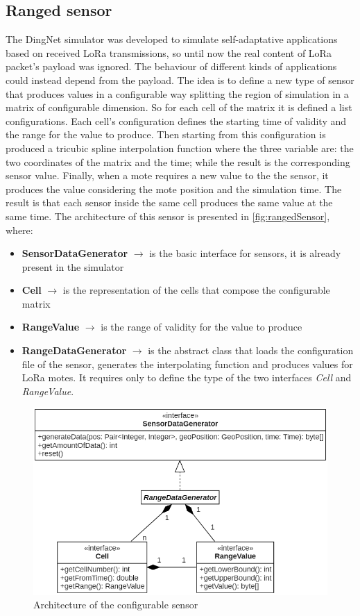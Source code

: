 \subsection{Ranged sensor}
The DingNet simulator was developed to simulate self-adaptative applications based on received LoRa transmissions, so until now the real content of LoRa packet's payload was ignored.
The behaviour of different kinds of applications could instead depend from the payload. 
The idea is to define a new type of sensor that produces values in a configurable way splitting the region of simulation in a matrix of configurable dimension. 
So for each cell of the matrix it is defined a list configurations. 
Each cell's configuration defines the starting time of validity and the range for the value to produce. 
Then starting from this configuration is produced a tricubic spline interpolation function where the three variable are: the two coordinates of the matrix and the time; while the result is the corresponding sensor value.
Finally, when a mote requires a new value to the the sensor, it produces the value considering the mote position and the simulation time.
The result is that each sensor inside the same cell produces the same value at the same time. 
The architecture of this sensor is presented in \autoref{fig:rangedSensor}, where:
\begin{itemize}
    \item \textbf{SensorDataGenerator} $\rightarrow$ is the basic interface for sensors, it is already present in the simulator
    \item \textbf{Cell} $\rightarrow$ is the representation of the cells that compose the configurable matrix
    \item \textbf{RangeValue} $\rightarrow$ is the range of validity for the value to produce
    \item \textbf{RangeDataGenerator} $\rightarrow$ is the abstract class that loads the configuration file of the sensor, generates the interpolating function and produces values for LoRa motes. It requires only to define the type of the two interfaces \textit{Cell} and \textit{RangeValue}.
\end{itemize}
% 
\begin{figure}[h]
    \centering
    \includegraphics[scale=0.7]{figures/rangedSensor.png}
    \caption{Architecture of the configurable sensor}
    \label{fig:rangedSensor}
\end{figure}
